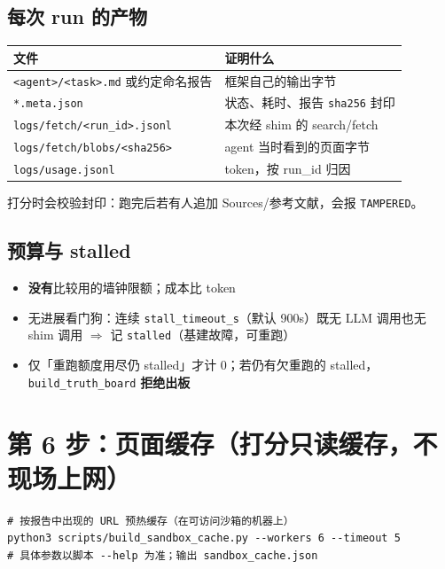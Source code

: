 \documentclass[10.5pt,a4paper]{article}
\begin{document}
\subsection{每次 run 的产物}

\begin{center}
\begin{tabularx}{\textwidth}{@{}lX@{}}
\toprule
文件 & 证明什么 \\
\midrule
\texttt{<agent>/<task>.md} 或约定命名报告 & 框架自己的输出字节 \\
\texttt{*.meta.json} & 状态、耗时、报告 \texttt{sha256} 封印 \\
\texttt{logs/fetch/<run\_id>.jsonl} & 本次经 shim 的 search/fetch \\
\texttt{logs/fetch/blobs/<sha256>} & agent 当时看到的页面字节 \\
\texttt{logs/usage.jsonl} & token，按 run\_id 归因 \\
\bottomrule
\end{tabularx}
\end{center}

打分时会校验封印：跑完后若有人追加 Sources/参考文献，会报 \texttt{TAMPERED}。

\subsection{预算与 stalled}

\begin{itemize}
  \item \textbf{没有}比较用的墙钟限额；成本比 token
  \item 无进展看门狗：连续 \texttt{stall\_timeout\_s}（默认 900s）既无 LLM 调用也无 shim 调用 $\Rightarrow$ 记 \texttt{stalled}（基建故障，可重跑）
  \item 仅「重跑额度用尽仍 stalled」才计 0；若仍有欠重跑的 stalled，\texttt{build\_truth\_board} \textbf{拒绝出板}
\end{itemize}

\section{第 6 步：页面缓存（打分只读缓存，不现场上网）}

\begin{lstlisting}
# 按报告中出现的 URL 预热缓存（在可访问沙箱的机器上）
python3 scripts/build_sandbox_cache.py --workers 6 --timeout 5
# 具体参数以脚本 --help 为准；输出 sandbox_cache.json
\end{lstlisting}
\end{document}
